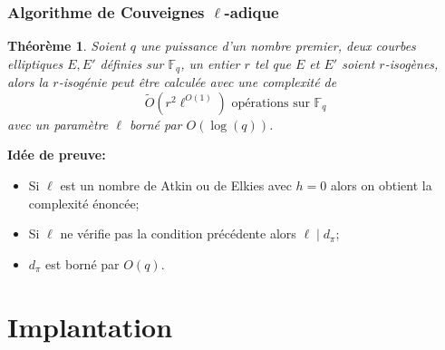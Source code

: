 \documentclass[10pt,a4paper]{beamer}
\theoremstyle{plain}
\newtheorem{thm}{Théorème}[part]
\theoremstyle{definition}
\theoremstyle{definition}
\theoremstyle{definition}
\theoremstyle{definition}
\theoremstyle{remark}
\theoremstyle{remark}
\theoremstyle{definition}
\begin{document}

\begin{frame}
\frametitle{Algorithme de Couveignes $\ell$-adique}

\begin{thm}
Soient $q$ une puissance d'un nombre premier, deux courbes elliptiques $E,E'$
définies sur $\mathbb{F}_q$, un entier $r$ tel que $E$ et $E'$ soient 
$r$-isogènes, alors la $r$-isogénie peut être calculée avec une complexité de
\[
\tilde{O}(r^2 \ell^{O(1)}) \text{ opérations sur }\mathbb{F}_q
\]
avec un paramètre $\ell$ borné par $O(\log(q))$.
\end{thm}
\textbf{Idée de preuve:} 
\begin{itemize}
\item Si $\ell$ est un nombre de Atkin ou de Elkies avec $h=0$ alors on obtient la complexité énoncée;
\item Si $\ell$ ne vérifie pas la condition précédente alors $\ell \mid d_{\pi}$;
\item $d_{\pi}$ est borné par $O(q)$.
\end{itemize}
\end{frame}

\section{Implantation}
\end{document}
